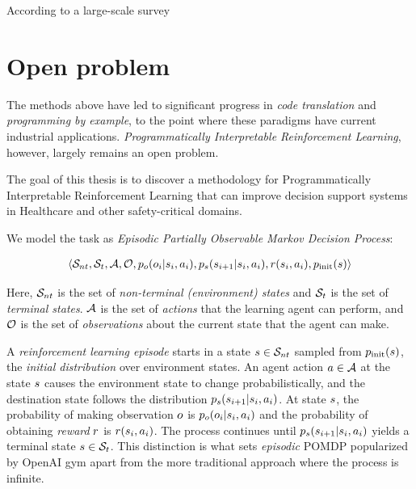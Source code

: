 According to a large-scale survey \cite{liangLargeScaleSurveyUsability2024} 

\newpage
\section{Open problem}
\label{sec:goal}

The methods above have led to significant progress in \emph{code translation} and \emph{programming by example}, to the point where these paradigms have current industrial applications.
\emph{Programmatically Interpretable Reinforcement Learning}, however, largely remains an open problem.

\begin{highlight}
The goal of this thesis is to discover a methodology for Programmatically Interpretable Reinforcement Learning that can improve decision support systems in Healthcare and other safety-critical domains.
\end{highlight}


We model the task as {\em Episodic Partially Observable Markov Decision Process}:

\begin{multline}
\langle \mathcal{S}_{nt}, \mathcal{S}_t, \mathcal{A}, \mathcal{O}, p_o(o_i | s_i, a_i), p_s(s_{i+1} | s_i, a_i), r(s_i,a_i), p_\text{init}(s) \rangle
\end{multline}

Here, $\mathcal{S}_{nt}$ is the set of {\em non-terminal (environment) states} and $\mathcal{S}_t$ is the set of {\em terminal states}. 
$\mathcal{A}$ is the set of {\em actions} that the learning agent can perform, and $\mathcal{O}$ is the set of {\em observations} about the current state that the agent can make. 

A \emph{reinforcement learning episode} starts in a state $s \in \mathcal{S}_{nt}$ sampled from $p_\text{init}(s)$, the {\em initial distribution} over environment states.
An agent action $a \in \mathcal{A}$ at the state $s$ causes the environment state to change probabilistically, and the destination state follows the distribution $p_s(s_{i+1} | s_i, a_i)$. 
At state $s$, the probability of making observation $o$ is $p_o(o_i | s_i, a_i)$ and the probability of obtaining \emph{reward} $r$ is $r(s_i,a_i)$. 
The process continues until $p_s(s_{i+1} | s_i, a_i)$ yields a terminal state $s \in \mathcal{S}_t$.
This distinction is what sets \emph{episodic} POMDP popularized by OpenAI gym \cite{openai-gym} apart from the more traditional approach \cite{kramerjdavidrPartiallyObservableMarkov1964, spaanPartiallyObservableMarkov2012} where the process is infinite.

